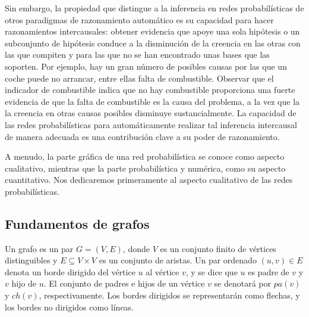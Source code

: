 Sin embargo, la propiedad que distingue a la inferencia en redes probabilísticas
de otros paradigmas de razonamiento automático es su capacidad para hacer razonamientos intercausales: 
obtener evidencia que apoye una sola hipótesis o un subconjunto de
hipótesis conduce a la disminución de la creencia en las otras con las que compiten y para las que no se 
han encontrado unas bases que las soporten. Por ejemplo, hay un gran número de posibles causas por las que un coche
puede no arrancar, entre ellas falta de combustible. Observar que el indicador de combustible indica que no hay combustible
proporciona una fuerte evidencia de que la falta de combustible es la causa del problema, a la vez que la
la creencia en otras causas posibles disminuye sustancialmente. La capacidad de las redes probabilísticas para automáticamente
realizar tal inferencia intercausal de manera adecuada es una contribución clave a su poder de razonamiento.

A menudo, la parte gráfica de una red probabilística se conoce como aspecto cualitativo, mientras que la 
parte probabilística y numérica, como su aspecto cuantitativo. Nos dedicaremos primeramente al aspecto 
cualitativo de las redes probabilísticas.

\subsection{Fundamentos de grafos}
Un grafo es un par $G = (V, E)$, donde $V$ es un conjunto finito de vértices distinguibles y 
$E \subseteq V \times V$ es un conjunto de aristas. Un par ordenado $(u, v) \in E$ denota un borde dirigido
del vértice $u$ al vértice $v$, y se dice que $u$ es padre de $v$ y $v$ hijo de $u$.
El conjunto de padres e hijos de un vértice $v$ se denotará por $pa(v)$ y $ch(v)$, respectivamente.
Los bordes dirigidos se representarán como flechas, y los bordes no dirigidos como líneas. 

